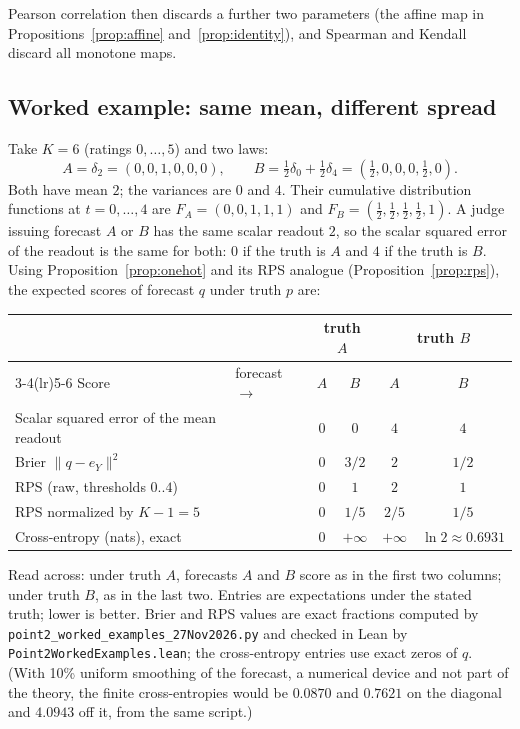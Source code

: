 \documentclass[11pt]{article}
\theoremstyle{remark}
\theoremstyle{definition}
\newcommand{\onehot}{e}
\newcommand{\1}{\mathbf{1}}
\newcommand{\file}[1]{\nolinkurl{#1}}
\begin{document}
Pearson correlation then discards a further two parameters (the affine map in Propositions~\ref{prop:affine} and~\ref{prop:identity}), and Spearman and Kendall discard all monotone maps.

\subsection{Worked example: same mean, different spread}

Take $K=6$ (ratings $0,\dots,5$) and two laws:
\[
A=\delta_{2}=(0,0,1,0,0,0),\qquad B=\tfrac12\delta_{0}+\tfrac12\delta_{4}=(\tfrac12,0,0,0,\tfrac12,0).
\]
Both have mean $2$; the variances are $0$ and $4$. Their cumulative distribution functions at $t=0,\dots,4$ are $F_A=(0,0,1,1,1)$ and $F_B=(\tfrac12,\tfrac12,\tfrac12,\tfrac12,1)$. A judge issuing forecast $A$ or $B$ has the same scalar readout $2$, so the scalar squared error of the readout is the same for both: $0$ if the truth is $A$ and $4$ if the truth is $B$. Using Proposition~\ref{prop:onehot} and its RPS analogue (Proposition~\ref{prop:rps}), the expected scores of forecast $q$ under truth $p$ are:

\begin{center}
\begin{tabular}{llcccc}
\toprule
 & & \multicolumn{2}{c}{truth $A$} & \multicolumn{2}{c}{truth $B$} \\
\cmidrule(lr){3-4}\cmidrule(lr){5-6}
Score & forecast $\to$ & $A$ & $B$ & $A$ & $B$ \\
\midrule
Scalar squared error of the mean readout & & $0$ & $0$ & $4$ & $4$ \\
Brier $\|q-\onehot_Y\|^{2}$ & & $0$ & $3/2$ & $2$ & $1/2$ \\
RPS (raw, thresholds $0..4$) & & $0$ & $1$ & $2$ & $1$ \\
RPS normalized by $K-1=5$ & & $0$ & $1/5$ & $2/5$ & $1/5$ \\
Cross-entropy (nats), exact & & $0$ & $+\infty$ & $+\infty$ & $\ln 2\approx0.6931$ \\
\bottomrule
\end{tabular}
\end{center}
Read across: under truth $A$, forecasts $A$ and $B$ score as in the first two columns; under truth $B$, as in the last two. Entries are expectations under the stated truth; lower is better. Brier and RPS values are exact fractions computed by \file{point2\_worked\_examples\_27Nov2026.py} and checked in Lean by \file{Point2WorkedExamples.lean}; the cross-entropy entries use exact zeros of $q$. (With 10\% uniform smoothing of the forecast, a numerical device and not part of the theory, the finite cross-entropies would be $0.0870$ and $0.7621$ on the diagonal and $4.0943$ off it, from the same script.)
\end{document}
